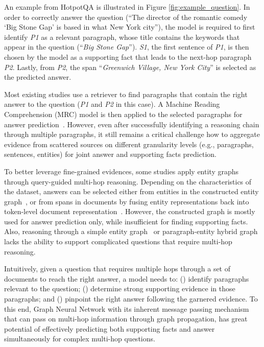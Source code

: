 \documentclass[11pt,a4paper]{article}
\begin{document}
An example from HotpotQA is illustrated in Figure \ref{fig:example_question}. In order to correctly answer the question (``The director of the romantic comedy `Big Stone Gap' is based in what New York city''), the model is required to first identify \textit{P1} as a relevant paragraph, whose title contains the keywords that appear in the question (``\emph{Big Stone Gap}''). \textit{S1}, the first sentence of \textit{P1}, is then chosen by the model as a supporting fact that leads to the next-hop paragraph \textit{P2}. Lastly, from \textit{P2}, the span ``\emph{Greenwich Village, New York City}'' is selected as the predicted answer.

Most existing studies use a retriever to find paragraphs that contain the right answer to the question (\textit{P1} and \textit{P2} in this case). A Machine Reading Comprehension (MRC) model is then applied to the selected paragraphs for answer prediction~\cite{nishida2019answering,min2019multi}. However, even after successfully identifying a reasoning chain through multiple paragraphs, it still remains a critical challenge how to aggregate evidence from scattered sources on different granularity levels (e.g., paragraphs, sentences, entities) for joint answer and supporting facts prediction.

To better leverage fine-grained evidences, some studies apply entity graphs through query-guided multi-hop reasoning. Depending on the characteristics of the dataset, answers can be selected either from entities in the constructed entity graph~\cite{song2018exploring, dhingra2018neural, de2018question, tu2019multi, ding2019cognitive}, or from spans in documents by fusing entity representations back into token-level document representation~\cite{DFGN}. However, the constructed graph is mostly used for answer prediction only, while insufficient for finding supporting facts. Also, reasoning through a simple entity graph~\cite{ding2019cognitive} or paragraph-entity hybrid graph~\cite{tu2019multi} lacks the ability to support complicated questions that require multi-hop reasoning.

Intuitively, given a question that requires multiple hops through a set of documents to reach the right answer, a model needs to: () identify paragraphs relevant to the question; () determine strong supporting evidence in those paragraphs; and () pinpoint the right answer following the garnered evidence. To this end, Graph Neural Network with its inherent message passing mechanism that can pass on multi-hop information through graph propagation, has great potential of effectively predicting both supporting facts and answer simultaneously for complex multi-hop questions. 
\end{document}
